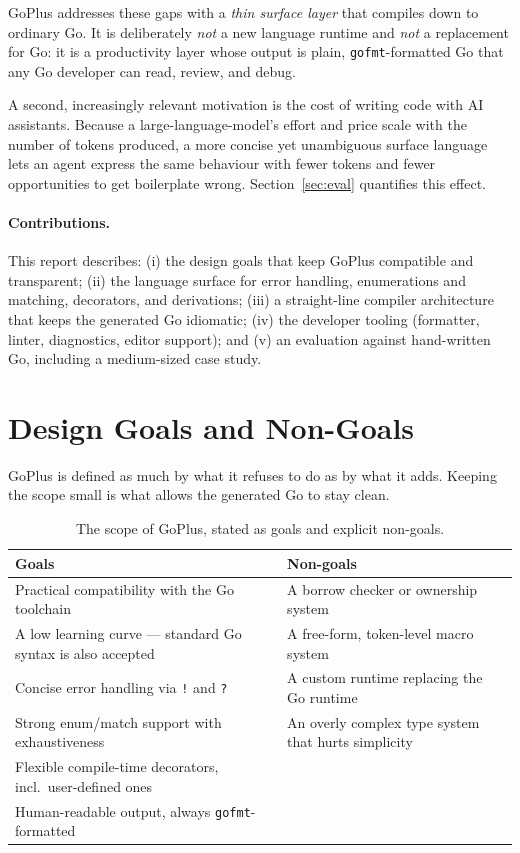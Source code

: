 \documentclass[11pt,a4paper]{article}
\begin{document}
GoPlus addresses these gaps with a \emph{thin surface layer} that compiles down
to ordinary Go. It is deliberately \emph{not} a new language runtime and \emph{not}
a replacement for Go: it is a productivity layer whose output is plain,
\texttt{gofmt}-formatted Go that any Go developer can read, review, and debug.

A second, increasingly relevant motivation is the cost of writing code with AI
assistants. Because a large-language-model's effort and price scale with the
number of tokens produced, a more concise yet unambiguous surface language lets
an agent express the same behaviour with fewer tokens and fewer opportunities to
get boilerplate wrong. Section~\ref{sec:eval} quantifies this effect.

\paragraph{Contributions.} This report describes: (i) the design goals that keep
GoPlus compatible and transparent; (ii) the language surface for error handling,
enumerations and matching, decorators, and derivations; (iii) a straight-line
compiler architecture that keeps the generated Go idiomatic; (iv) the developer
tooling (formatter, linter, diagnostics, editor support); and (v) an evaluation
against hand-written Go, including a medium-sized case study.

\section{Design Goals and Non-Goals}
GoPlus is defined as much by what it refuses to do as by what it adds. Keeping
the scope small is what allows the generated Go to stay clean.

\begin{table}[h]
\centering
\renewcommand{\arraystretch}{1.25}
\begin{tabularx}{\textwidth}{@{}p{} X@{}}
\toprule
\textbf{\color{hustred}Goals} & \textbf{\color{hustred}Non-goals} \\
\midrule
Practical compatibility with the Go toolchain &
A borrow checker or ownership system \\
A low learning curve --- standard Go syntax is also accepted &
A free-form, token-level macro system \\
Concise error handling via \texttt{!} and \texttt{?} &
A custom runtime replacing the Go runtime \\
Strong enum/match support with exhaustiveness &
An overly complex type system that hurts simplicity \\
Flexible compile-time decorators, incl.\ user-defined ones & \\
Human-readable output, always \texttt{gofmt}-formatted & \\
\bottomrule
\end{tabularx}
\caption{The scope of GoPlus, stated as goals and explicit non-goals.}
\end{table}
\end{document}
